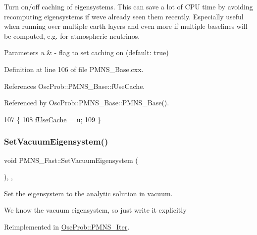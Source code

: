 Turn on/off caching of eigensystems. This can save a lot of C\+PU time by avoiding recomputing eigensystems if we\textquotesingle{}ve already seen them recently. Especially useful when running over multiple earth layers and even more if multiple baselines will be computed, e.\+g. for atmospheric neutrinos.


\begin{DoxyParams}{Parameters}
{\em u} & -\/ flag to set caching on (default\+: true) \\
\hline
\end{DoxyParams}


Definition at line 106 of file P\+M\+N\+S\+\_\+\+Base.\+cxx.



References Osc\+Prob\+::\+P\+M\+N\+S\+\_\+\+Base\+::f\+Use\+Cache.



Referenced by Osc\+Prob\+::\+P\+M\+N\+S\+\_\+\+Base\+::\+P\+M\+N\+S\+\_\+\+Base().


\begin{DoxyCode}
107 \{
108   \hyperlink{classOscProb_1_1PMNS__Base_ad28c12ef897b5555eda509ea55c99107}{fUseCache} = u; 
109 \}
\end{DoxyCode}
\mbox{\label{classOscProb_1_1PMNS__Fast_a76dd5a761df8689c502b28ad0391f9e2}} 
\subsubsection{\texorpdfstring{Set\+Vacuum\+Eigensystem()}{SetVacuumEigensystem()}}
{\footnotesize\ttfamily void P\+M\+N\+S\+\_\+\+Fast\+::\+Set\+Vacuum\+Eigensystem (\begin{DoxyParamCaption}{ }\end{DoxyParamCaption})\hspace{0.3cm}{\ttfamily [protected]}, {\ttfamily [virtual]}, {\ttfamily [inherited]}}

Set the eigensystem to the analytic solution in vacuum.

We know the vacuum eigensystem, so just write it explicitly 

Reimplemented in \hyperlink{classOscProb_1_1PMNS__Iter_a39db92ee063e813ef68b3e0177778429}{Osc\+Prob\+::\+P\+M\+N\+S\+\_\+\+Iter}.



